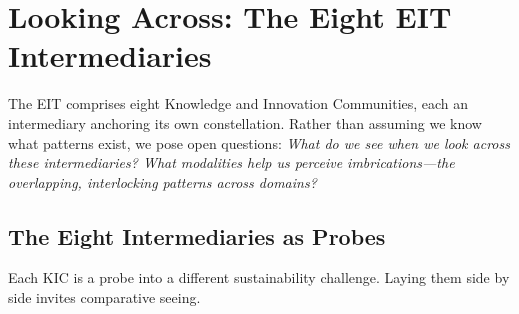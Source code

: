 \documentclass[
    fontsize=10pt,
    twoside=true,
    secnumdepth=2,
    numbers=noenddot
]{kaobook}
\begin{document}
\section{Looking Across: The Eight EIT Intermediaries}

The EIT comprises eight Knowledge and Innovation Communities, each an intermediary anchoring its own constellation. Rather than assuming we know what patterns exist, we pose open questions: \textit{What do we see when we look across these intermediaries? What modalities help us perceive imbrications---the overlapping, interlocking patterns across domains?}

\subsection{The Eight Intermediaries as Probes}

Each KIC is a probe into a different sustainability challenge. Laying them side by side invites comparative seeing.
\end{document}
